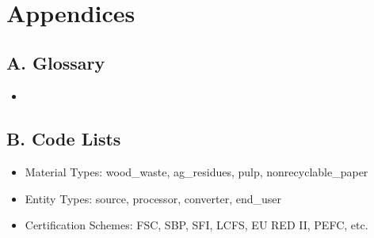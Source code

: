\documentclass{article}
\begin{document}
\
\section{Appendices}
\subsection*{A. Glossary}
\begin{itemize}[noitemsep]
    \item \textbf{}
\end{itemize}

\subsection*{B. Code Lists}
\begin{itemize}[noitemsep]
    \item Material Types: wood\_waste, ag\_residues, pulp, nonrecyclable\_paper
    \item Entity Types: source, processor, converter, end\_user
    \item Certification Schemes: FSC, SBP, SFI, LCFS, EU RED II, PEFC, etc. 
\end{itemize}
\end{document}
